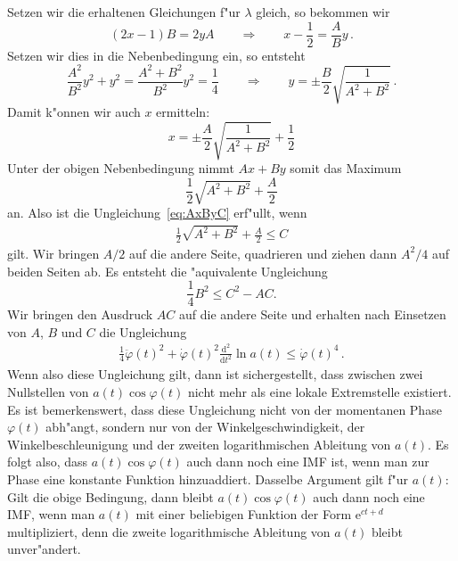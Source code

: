 \documentclass[a4paper]{scrartcl}
\newcommand{\de}{{\mathrm{d}}}
\newcommand{\ee}{{\mathrm{e}}}
\newcommand{\pphi}{{\varphi}}
\begin{document}
Setzen wir die erhaltenen Gleichungen f"ur $\lambda$ gleich, so bekommen wir 
$$ (2x-1)B = 2yA \qquad \Longrightarrow \qquad
x-\frac12 = \frac AB y\,. $$
Setzen wir dies in die Nebenbedingung ein, so entsteht
$$ \frac{A^2}{B^2}y^2 + y^2 = \frac{A^2+B^2}{B^2}y^2 
= \frac14 \qquad \Longrightarrow \qquad
y=\pm\frac B2\sqrt{\frac{1}{A^2+B^2}}\,. $$
Damit k"onnen wir auch $x$ ermitteln:
$$ x = \pm\frac A2\sqrt{\frac{1}{A^2+B^2}} + \frac12 $$
Unter der obigen Nebenbedingung nimmt $Ax+By$ somit das Maximum
$$ \frac12 \sqrt{A^2+B^2}+\frac A2 $$
an. Also ist die Ungleichung~\eqref{eq:AxByC} erf"ullt, wenn 
\begin{align} \label{eq:intermediateABC}
  \frac12\sqrt{A^2+B^2}+\frac A2 \le C 
\end{align}
gilt. Wir bringen $A/2$ auf die andere Seite, quadrieren und ziehen dann $A^2/4$ auf beiden Seiten ab. 
Es entsteht die "aquivalente Ungleichung
$$ \frac14 B^2 \le C^2 - AC. $$
Wir bringen den Ausdruck $AC$ auf die andere Seite und erhalten nach Einsetzen von $A$, $B$ und $C$ die Ungleichung
\begin{align} \label{eq:condpphiiai}
  \frac14\ddot\pphi(t)^2 + \dot\pphi(t)^2\frac{\de^2}{\de t^2}\ln a(t) 
  \le \dot\pphi(t)^4\,.
\end{align}
Wenn also diese Ungleichung gilt, dann ist sichergestellt, dass zwischen zwei Nullstellen von $a(t)\cos\pphi(t)$ nicht mehr als eine lokale Extremstelle existiert. 
Es ist bemerkenswert, dass diese Ungleichung nicht von der momentanen Phase $\pphi(t)$ abh"angt, sondern nur von der Winkelgeschwindigkeit, der Winkelbeschleunigung und der zweiten logarithmischen Ableitung von $a(t)$. 
Es folgt also, dass $a(t)\cos\pphi(t)$ auch dann noch eine IMF ist, wenn man zur Phase eine konstante Funktion hinzuaddiert. 
Dasselbe Argument gilt f"ur $a(t)$: Gilt die obige Bedingung, dann bleibt $a(t)\cos\pphi(t)$ auch dann noch eine IMF, wenn man  $a(t)$ mit einer beliebigen Funktion der Form $\ee^{ct+d}$ multipliziert, denn die zweite logarithmische Ableitung von $a(t)$ bleibt unver"andert. 
\end{document}
